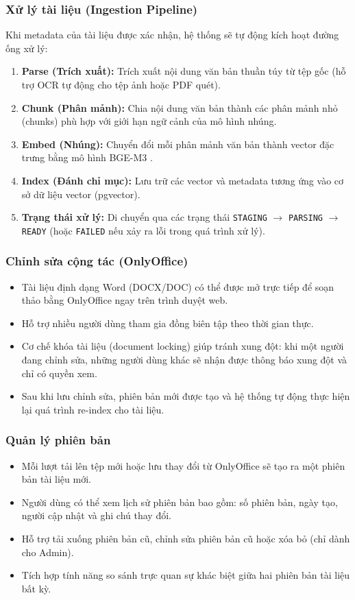 \documentclass[12pt,a4paper]{report}
\begin{document}
\subsubsection{Xử lý tài liệu (Ingestion Pipeline)}
Khi metadata của tài liệu được xác nhận, hệ thống sẽ tự động kích hoạt đường ống xử lý:
\begin{enumerate}
    \item \textbf{Parse (Trích xuất):} Trích xuất nội dung văn bản thuần túy từ tệp gốc (hỗ trợ OCR tự động cho tệp ảnh hoặc PDF quét).
    \item \textbf{Chunk (Phân mảnh):} Chia nội dung văn bản thành các phân mảnh nhỏ (chunks) phù hợp với giới hạn ngữ cảnh của mô hình nhúng.
    \item \textbf{Embed (Nhúng):} Chuyển đổi mỗi phân mảnh văn bản thành vector đặc trưng bằng mô hình BGE-M3 \cite{bgem32024}.
    \item \textbf{Index (Đánh chỉ mục):} Lưu trữ các vector và metadata tương ứng vào cơ sở dữ liệu vector (pgvector).
    \item \textbf{Trạng thái xử lý:} Di chuyển qua các trạng thái \texttt{STAGING} $\rightarrow$ \texttt{PARSING} $\rightarrow$ \texttt{READY} (hoặc \texttt{FAILED} nếu xảy ra lỗi trong quá trình xử lý).
\end{enumerate}

\subsubsection{Chỉnh sửa cộng tác (OnlyOffice)}
\begin{itemize}
    \item Tài liệu định dạng Word (DOCX/DOC) có thể được mở trực tiếp để soạn thảo bằng OnlyOffice ngay trên trình duyệt web.
    \item Hỗ trợ nhiều người dùng tham gia đồng biên tập theo thời gian thực.
    \item Cơ chế khóa tài liệu (document locking) giúp tránh xung đột: khi một người đang chỉnh sửa, những người dùng khác sẽ nhận được thông báo xung đột và chỉ có quyền xem.
    \item Sau khi lưu chỉnh sửa, phiên bản mới được tạo và hệ thống tự động thực hiện lại quá trình re-index cho tài liệu.
\end{itemize}

\subsubsection{Quản lý phiên bản}
\begin{itemize}
    \item Mỗi lượt tải lên tệp mới hoặc lưu thay đổi từ OnlyOffice sẽ tạo ra một phiên bản tài liệu mới.
    \item Người dùng có thể xem lịch sử phiên bản bao gồm: số phiên bản, ngày tạo, người cập nhật và ghi chú thay đổi.
    \item Hỗ trợ tải xuống phiên bản cũ, chỉnh sửa phiên bản cũ hoặc xóa bỏ (chỉ dành cho Admin).
    \item Tích hợp tính năng so sánh trực quan sự khác biệt giữa hai phiên bản tài liệu bất kỳ.
\end{itemize}
\end{document}
